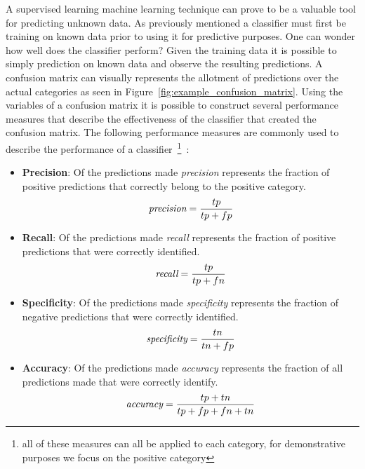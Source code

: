 A supervised learning machine learning technique can prove to be a valuable tool for predicting unknown data. As previously mentioned a classifier must first be training on known data prior to using it for predictive purposes. One can wonder how well does the classifier perform? Given the training data it is possible to simply prediction on known data and observe the resulting predictions. A confusion matrix can visually represents the allotment of predictions over the actual categories as seen in Figure~\ref{fig:example_confusion_matrix}. Using the variables of a confusion matrix it is possible to construct several performance measures that describe the effectiveness of the classifier that created the confusion matrix. The following performance measures are commonly used to describe the performance of a classifier~\footnote{all of these measures can all be applied to each category, for demonstrative purposes we focus on the positive category}~\cite{SJS06}:

\begin{itemize}
  \item \textbf{Precision}: Of the predictions made \emph{precision} represents the fraction of positive predictions that correctly belong to the positive category.
  \begin{equation}
    \emph{$\text{precision} = \frac{tp}{tp + fp}$}
    \label{equ:precision}
  \end{equation}

  \item \textbf{Recall}: Of the predictions made \emph{recall} represents the fraction of positive predictions that were correctly identified.
  \begin{equation}
    \emph{$\text{recall} = \frac{tp}{tp + fn}$}
    \label{equ:recall}
  \end{equation}

  \item \textbf{Specificity}: Of the predictions made \emph{specificity} represents the fraction of negative predictions that were correctly identified.
  \begin{equation}
    \emph{$\text{specificity} = \frac{tn}{tn + fp}$}
    \label{equ:specificity}
  \end{equation}

  \item \textbf{Accuracy}: Of the predictions made \emph{accuracy} represents the fraction of all predictions made that were correctly identify.
  \begin{equation}
    \emph{$\text{accuracy} = \frac{tp + tn}{tp + fp + fn + tn}$}
    \label{equ:accuracy}
  \end{equation}
\end{itemize}


